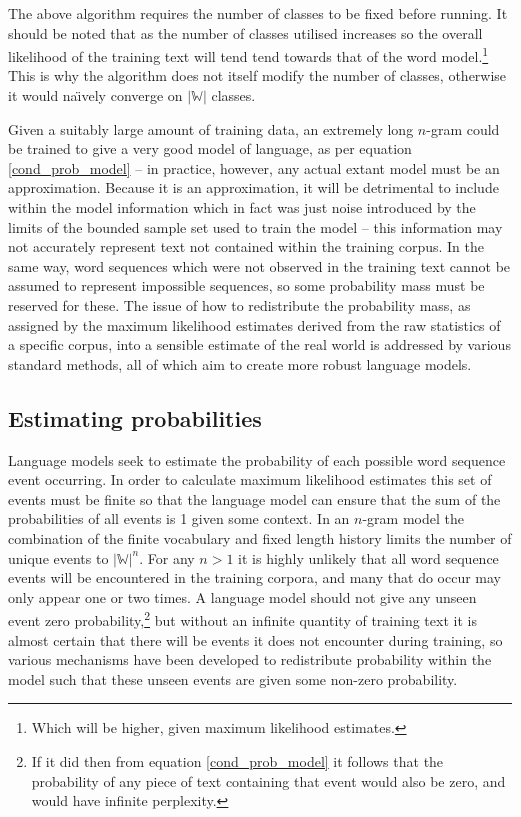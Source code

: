 The above algorithm requires the number of classes to be fixed before
running. It should be noted that as the number of classes utilised
increases so the overall likelihood of the training text will tend
tend towards that of the word model.\footnote{Which will be higher,
given maximum likelihood estimates.}  This is why the algorithm does
not itself modify the number of classes, otherwise it would
na\"{\i}vely converge on $|\mathbb{W}|$ classes.



\label{robust_estimation}
Given a suitably large amount of training data, an extremely long $n$-gram
could be trained to give a very good model of language, as per equation
\ref{cond_prob_model} -- in practice, however,
any actual extant model must be an approximation. Because it is an
approximation, it will be detrimental to include within the model
information which in fact was just noise introduced by the limits of
the bounded sample set used to train the model -- this information may
not accurately represent text not contained within the training
corpus. In the same way, word sequences which were not observed in the
training text cannot be assumed to represent impossible sequences, so
some probability mass must be reserved for these. The issue of how to
redistribute the probability mass, as assigned by the maximum likelihood
estimates derived from the raw statistics of a specific corpus, into a
sensible estimate of the real world is addressed by various standard
methods, all of which aim to create more robust language models.

\subsection{Estimating probabilities}\label{discounting_and_other_fun_things}
Language models seek to estimate the probability of each possible word
sequence event occurring. In order to calculate maximum likelihood
estimates this set of events must be finite so that the language model
can ensure that the sum of the probabilities of all events is 1 given
some context. In an $n$-gram model the combination of the finite vocabulary
and fixed length history limits the number of unique events to
$|\mathbb{W}|^n$.  For any $n>1$ it is highly unlikely that all word
sequence events will be encountered in the training corpora, and many
that do occur may only appear one or two times. A language model
should not give any unseen event zero probability,\footnote{If it did
then from equation \ref{cond_prob_model} it follows that the
probability of any piece of text containing that event would also be
zero, and would have infinite perplexity.} but without an infinite
quantity of training text it is almost certain that there will be
events it does not encounter during training, so various mechanisms
have been developed to redistribute probability within the model such that these
unseen events are given some non-zero probability. %

